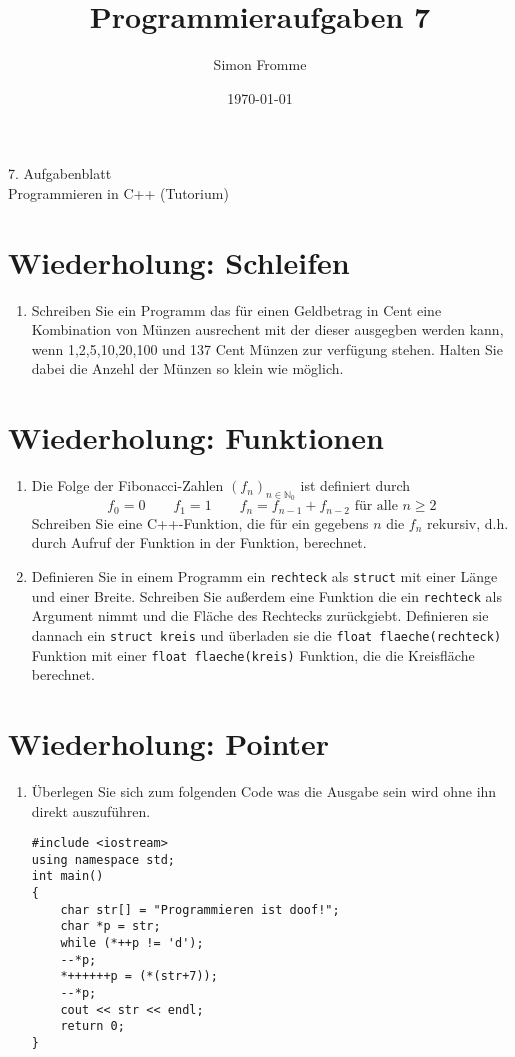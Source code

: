 \documentclass[paper=a4, fontsize=11pt, twoside]{scrartcl}
\title{Programmieraufgaben 7}
\author{Simon Fromme}
\date{\normalsize\today}
\begin{document}
\vspace*{0.75\baselineskip}
\begin{center}
  \Large 7. Aufgabenblatt \\\vspace{0.5em} \large Programmieren in C++ (Tutorium)
\end{center}
\section*{Wiederholung: Schleifen}
\begin{enumerate}
	\item Schreiben Sie ein Programm das für einen Geldbetrag in Cent eine Kombination von Münzen ausrechent mit der dieser ausgegben werden kann, wenn 1,2,5,10,20,100 und 137 Cent Münzen zur verfügung stehen. Halten Sie dabei die Anzehl der Münzen so klein wie möglich. 
\end{enumerate}


\section*{Wiederholung: Funktionen}
\begin{enumerate}[resume]
  \item Die Folge der Fibonacci-Zahlen $(f_{n})_{n\in\mathbb{N}_0}$ ist definiert durch 
	  \[
		  f_0=0 \qquad f_1=1 \qquad f_n=f_{n-1} + f_{n-2} \text{ für alle } n\geq 2
	  \]
	  Schreiben Sie eine C++-Funktion, die für ein gegebens $n$ die $f_n$ rekursiv, d.h. durch Aufruf der Funktion in der Funktion, berechnet.
  \item Definieren Sie in einem Programm ein \texttt{rechteck} als \texttt{struct} mit einer Länge und einer Breite.
	  Schreiben Sie außerdem eine Funktion die ein \texttt{rechteck} als Argument nimmt und die Fläche des Rechtecks zurückgiebt. 
	  Definieren sie dannach ein \texttt{struct kreis} und überladen sie die \texttt{float flaeche(rechteck)} Funktion mit einer \texttt{float flaeche(kreis)} Funktion, die die Kreisfläche berechnet.
\end{enumerate}

\section*{Wiederholung: Pointer}
\begin{enumerate}[resume]
  \item Überlegen Sie sich zum folgenden Code was die Ausgabe sein wird ohne ihn direkt auszuführen. 
	  \begin{verbatim}
#include <iostream>
using namespace std;
int main()
{
	char str[] = "Programmieren ist doof!";
	char *p = str;
	while (*++p != 'd');
	--*p;
	*++++++p = (*(str+7));
	--*p;
	cout << str << endl;
	return 0;
}
	  \end{verbatim}
\end{enumerate}
\end{document}
